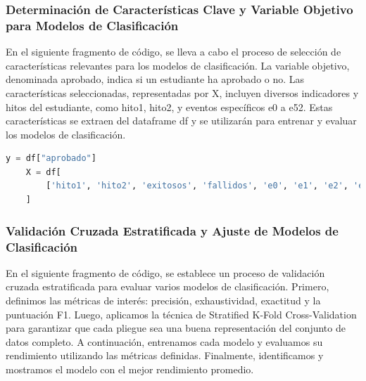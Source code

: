 
\subsubsection{Determinación de Características Clave y Variable Objetivo para Modelos de Clasificación}

En el siguiente fragmento de código, se lleva a cabo el proceso de selección de características relevantes para los modelos de clasificación. La variable objetivo, denominada aprobado, indica si un estudiante ha aprobado o no. Las características seleccionadas, representadas por X, incluyen diversos indicadores y hitos del estudiante, como hito1, hito2, y eventos específicos e0 a e52. Estas características se extraen del dataframe df y se utilizarán para entrenar y evaluar los modelos de clasificación.

\begin{lstlisting}[language=Python, caption=Selección de características y variable objetivo, label=lst:seleccion_caracteristicas]
    y = df["aprobado"]
    X = df[
        ['hito1', 'hito2', 'exitosos', 'fallidos', 'e0', 'e1', 'e2', 'e3', 'e4', 'e5', 'e6', 'e7', 'e8', 'e9', 'e10', 'e11', 'e12', 'e13', 'e14', 'e15', 'e16', 'e17', 'e18', 'e19', 'e20', 'e21', 'e22', 'e23', 'e24', 'e25', 'e26', 'e27', 'e28', 'e29', 'e30', 'e31', 'e32', 'e33', 'e34', 'e35', 'e36', 'e37', 'e38', 'e39', 'e40', 'e41', 'e42', 'e43', 'e44', 'e45', 'e46', 'e47', 'e48', 'e49', 'e50', 'e51', 'e52']
    ]
\end{lstlisting}


\subsubsection{Validación Cruzada Estratificada y Ajuste de Modelos de Clasificación}

En el siguiente fragmento de código, se establece un proceso de validación cruzada estratificada para evaluar varios modelos de clasificación. Primero, definimos las métricas de interés: precisión, exhaustividad, exactitud y la puntuación F1. Luego, aplicamos la técnica de Stratified K-Fold Cross-Validation para garantizar que cada pliegue sea una buena representación del conjunto de datos completo. A continuación, entrenamos cada modelo y evaluamos su rendimiento utilizando las métricas definidas. Finalmente, identificamos y mostramos el modelo con el mejor rendimiento promedio.

